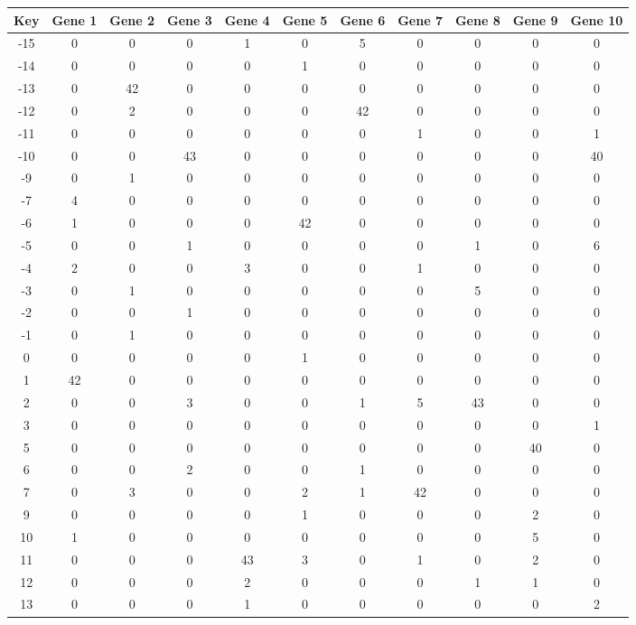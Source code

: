 \begin{tabular}{|c|c|c|c|c|c|c|c|c|c|c|}
\hline
Key & Gene 1 & Gene 2 & Gene 3 & Gene 4 & Gene 5 & Gene 6 & Gene 7 & Gene 8 & Gene 9 & Gene 10 \\
\hline
-15 & 0 & 0 & 0 & 1 & 0 & 5 & 0 & 0 & 0 & 0 \\
-14 & 0 & 0 & 0 & 0 & 1 & 0 & 0 & 0 & 0 & 0 \\
-13 & 0 & 42 & 0 & 0 & 0 & 0 & 0 & 0 & 0 & 0 \\
-12 & 0 & 2 & 0 & 0 & 0 & 42 & 0 & 0 & 0 & 0 \\
-11 & 0 & 0 & 0 & 0 & 0 & 0 & 1 & 0 & 0 & 1 \\
-10 & 0 & 0 & 43 & 0 & 0 & 0 & 0 & 0 & 0 & 40 \\
-9 & 0 & 1 & 0 & 0 & 0 & 0 & 0 & 0 & 0 & 0 \\
-7 & 4 & 0 & 0 & 0 & 0 & 0 & 0 & 0 & 0 & 0 \\
-6 & 1 & 0 & 0 & 0 & 42 & 0 & 0 & 0 & 0 & 0 \\
-5 & 0 & 0 & 1 & 0 & 0 & 0 & 0 & 1 & 0 & 6 \\
-4 & 2 & 0 & 0 & 3 & 0 & 0 & 1 & 0 & 0 & 0 \\
-3 & 0 & 1 & 0 & 0 & 0 & 0 & 0 & 5 & 0 & 0 \\
-2 & 0 & 0 & 1 & 0 & 0 & 0 & 0 & 0 & 0 & 0 \\
-1 & 0 & 1 & 0 & 0 & 0 & 0 & 0 & 0 & 0 & 0 \\
0 & 0 & 0 & 0 & 0 & 1 & 0 & 0 & 0 & 0 & 0 \\
1 & 42 & 0 & 0 & 0 & 0 & 0 & 0 & 0 & 0 & 0 \\
2 & 0 & 0 & 3 & 0 & 0 & 1 & 5 & 43 & 0 & 0 \\
3 & 0 & 0 & 0 & 0 & 0 & 0 & 0 & 0 & 0 & 1 \\
5 & 0 & 0 & 0 & 0 & 0 & 0 & 0 & 0 & 40 & 0 \\
6 & 0 & 0 & 2 & 0 & 0 & 1 & 0 & 0 & 0 & 0 \\
7 & 0 & 3 & 0 & 0 & 2 & 1 & 42 & 0 & 0 & 0 \\
9 & 0 & 0 & 0 & 0 & 1 & 0 & 0 & 0 & 2 & 0 \\
10 & 1 & 0 & 0 & 0 & 0 & 0 & 0 & 0 & 5 & 0 \\
11 & 0 & 0 & 0 & 43 & 3 & 0 & 1 & 0 & 2 & 0 \\
12 & 0 & 0 & 0 & 2 & 0 & 0 & 0 & 1 & 1 & 0 \\
13 & 0 & 0 & 0 & 1 & 0 & 0 & 0 & 0 & 0 & 2 \\
\hline
\end{tabular}